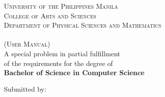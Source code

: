 \begin{titlepage}

\begin{center}



\textsc{\large University of the Philippines Manila}\\
\textsc{\large College of Arts and Sciences}\\
\textsc{\large Department of Physical Sciences and Mathematics}\\[3.5cm]

\textsc{\Large \MyTitle}\\[3.5cm]

\textsc{\Large (User Manual)} \\[3.5cm]

A special problem in partial fulfillment\\
of the requirements for the degree of\\
\textbf{Bachelor of Science in Computer Science}


\vfill

Submitted by:\\[1.25cm]
\MyAuthor\\
{\MyDate}
\\[1cm]

\end{center}

\end{titlepage}